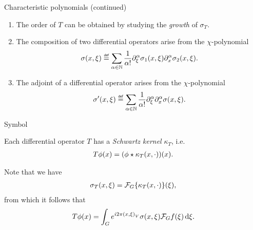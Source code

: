 \documentclass{beamer}
\begin{document}
\begin{frame}
    {Characteristic polynomials (continued)}

    \begin{enumerate}
        \item
            The order of $T$ can be obtained by studying the \emph{growth} of $\sigma_T$.
            \pause
        \item
            The composition of two differential operators arise from the $\chi$-polynomial
            \begin{align}
                \sigma(x, \xi)
                \defeq
                \sum_{\alpha \in \N}
                \frac 1 {\alpha!}
                \iD {\xi^\alpha} \sigma_1(x, \xi)
                \iD {x^\alpha} \sigma_2(x, \xi).
                \label{eq:Euclidean_composition_formula}
            \end{align}
            \pause
        \item
            The adjoint of a differential operator arises from the $\chi$-polynomial
            \begin{align}
                \sigma'(x, \xi)
                \defeq
                \sum_{\alpha \in \N}
                \frac 1 {\alpha!}
                \iD {\xi^\alpha}
                \iD {x^\alpha} \sigma(x, \xi).
                \label{eq:Euclidean_adjunction_formula}
            \end{align}
    \end{enumerate}
\end{frame}

\begin{frame}
    {Symbol}

    Each differential operator $T$ has a \emph{Schwartz kernel} $\kappa_T$, i.e.\
    \begin{align*}
        T \phi(x) = (\phi \star \kappa_T(x, \cdot))(x).
    \end{align*}

    \pause
    Note that we have
    \begin{align*}
        \sigma_T(x, \xi)
        = \mathcal{F}_{G} \{\kappa_T(x, \cdot)\}(\xi),
    \end{align*}
    \pause
    from which it follows that
    \begin{align*}
        T \phi(x) =
        \int_{G} e^{i 2 \pi {\left(x, \xi\right)_{V}}} \sigma(x, \xi) \mathcal{F}_{G} f(\xi) \,\mathrm{d} \xi.
    \end{align*}
\end{frame}
\end{document}
